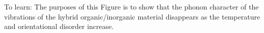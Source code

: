 \documentclass[journal=cmatex,manuscript=article]{achemso}
\begin{document}
To learn: The purposes of this Figure is to show that the phonon character of the vibrations of the hybrid organic/inorganic material disappears as the temperature and orientational disorder increase. 





\newpage

\end{document}
